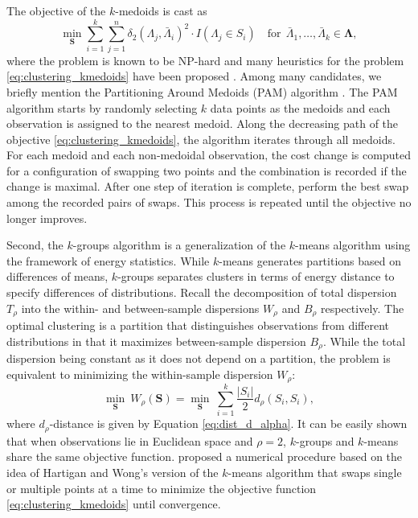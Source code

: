 \documentclass[12pt]{article}
\newcommand{\bfS}{\mathbf{S}}
\newcommand{\bfLambda}{\mathbf{\Lambda}}
\begin{document}
The objective of the $k$-medoids is cast as 
\begin{equation}\label{eq:clustering_kmedoids}
\underset{\bfS}{\min} \sum_{i=1}^k \sum_{j=1}^n \delta_2 (\Lambda_j, \bar{\Lambda}_i)^2 \cdot I(\Lambda_j \in S_i)\quad \textrm{for}~~ \bar{\Lambda}_1,\ldots,\bar{\Lambda}_k \in \bfLambda,
\end{equation}
where the problem is known to be NP-hard and many heuristics for the problem \eqref{eq:clustering_kmedoids} have been proposed \citep{amato_faster_2019}. Among many candidates, we briefly mention the Partitioning Around Medoids (PAM) algorithm \citep{kaufman_partitioning_1990}. The PAM algorithm starts by randomly selecting $k$ data points as the medoids and each observation is assigned to the nearest medoid. Along the decreasing path of the objective \eqref{eq:clustering_kmedoids}, the algorithm iterates through all medoids. For each medoid and each non-medoidal observation, the cost change is computed for a configuration of swapping two points and the combination is recorded if the change is maximal. After one step of iteration is complete, perform the best swap among the recorded pairs of swaps. This process is repeated until the objective no longer improves. 


Second, the $k$-groups algorithm \citep{li_k-groups_2017} is a generalization of the $k$-means algorithm using the framework of energy statistics. While $k$-means generates partitions based on differences of means, $k$-groups separates clusters in terms of energy distance to specify differences of distributions. Recall the decomposition of total dispersion $T_\rho$ into the within- and between-sample dispersions $W_\rho$ and $B_\rho$ respectively. The optimal clustering is a partition that distinguishes observations from different distributions in that it maximizes between-sample dispersion $B_\rho$. While the total dispersion being constant as it does not depend on a partition, the problem is equivalent to minimizing the within-sample dispersion $W_\rho$:
\begin{equation}\label{eq:clustering_kgroups}
\underset{\bfS}{\min}\ W_\rho(\bfS) = \underset{\bfS}{\min}\ \sum_{i=1}^k \frac{|S_i|}{2} d_\rho (S_i, S_i),
\end{equation}
where $d_\rho$-distance is given by Equation \eqref{eq:dist_d_alpha}. It can be easily shown that when observations lie in Euclidean space and $\rho=2$, $k$-groups and $k$-means share the same objective function. \cite{li_k-groups_2017} proposed a numerical procedure based on the idea of Hartigan and Wong's version of the $k$-means algorithm \citep{hartigan_algorithm_1979} that swaps single or multiple points at a time to minimize the objective function \eqref{eq:clustering_kmedoids} until convergence. 
\end{document}
